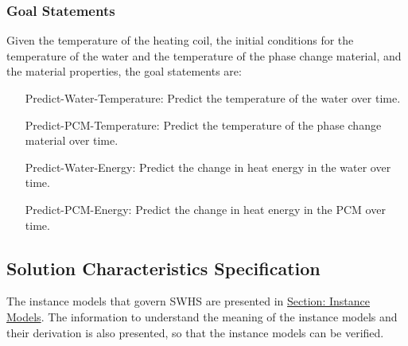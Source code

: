 \documentclass[12pt]{article}
\begin{document}
\subsubsection{Goal Statements}
\label{Sec:GoalStmt}
Given the temperature of the heating coil, the initial conditions for the temperature of the water and the temperature of the phase change material, and the material properties, the goal statements are:
\begin{itemize}
\item[Predict-Water-Temperature:\phantomsection\label{waterTempGS}]Predict the temperature of the water over time.
\item[Predict-PCM-Temperature:\phantomsection\label{pcmTempGS}]Predict the temperature of the phase change material over time.
\item[Predict-Water-Energy:\phantomsection\label{waterEnergyGS}]Predict the change in heat energy in the water over time.
\item[Predict-PCM-Energy:\phantomsection\label{pcmEnergyGS}]Predict the change in heat energy in the PCM over time.
\end{itemize}
\subsection{Solution Characteristics Specification}
\label{Sec:SolCharSpec}
The instance models that govern SWHS are presented in \hyperref[Sec:IMs]{Section: Instance Models}. The information to understand the meaning of the instance models and their derivation is also presented, so that the instance models can be verified.
\end{document}
